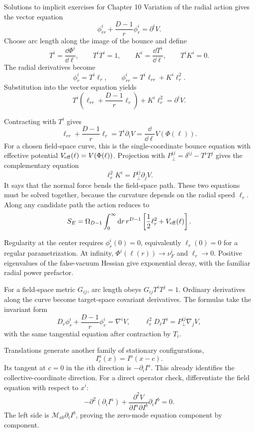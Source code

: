 \begin{bankssolutions}{Solutions to implicit exercises for Chapter 10}
Variation of the radial action gives the vector equation
\[
  \phi_{rr}^i+\frac{D-1}{r}\phi_r^i=\partial^iV.
\]
Choose arc length along the image of the bounce and define
\[
  T^i=\frac{\dd\Phi^i}{\dd\ell},
  \qquad T^iT^i=1,
  \qquad K^i=\frac{\dd T^i}{\dd\ell},
  \qquad T^iK^i=0.
\]
The radial derivatives become
\[
  \phi_r^i=T^i\ell_r,
  \qquad
  \phi_{rr}^i=T^i\ell_{rr}+K^i\ell_r^2.
\]
Substitution into the vector equation yields
\[
  T^i\left(\ell_{rr}+\frac{D-1}{r}\ell_r\right)
  +K^i\ell_r^2=\partial^iV.
\]

Contracting with $T^i$ gives
\[
  \ell_{rr}+\frac{D-1}{r}\ell_r
  =T^i\partial_iV
  =\frac{\dd}{\dd\ell}V(\Phi(\ell)).
\]
For a chosen field-space curve, this is the single-coordinate bounce equation
with effective potential $V_{\rm eff}(\ell)=V(\Phi(\ell))$.  Projection with
$P_\perp^{ij}=\delta^{ij}-T^iT^j$ gives the complementary equation
\[
  \ell_r^2K^i=P_\perp^{ij}\partial_jV.
\]
It says that the normal force bends the field-space path.  These two equations
must be solved together, because the curvature depends on the radial speed
$\ell_r$.  Along any candidate path the action reduces to
\[
  S_E=\Omega_{D-1}\int_0^\infty\mathop{}\!\mathrm{d} r\,r^{D-1}
  \left[\frac12\ell_r^2+V_{\rm eff}(\ell)\right].
\]

Regularity at the center requires $\phi_r^i(0)=0$, equivalently
$\ell_r(0)=0$ for a regular parametrization.  At infinity,
$\Phi^i(\ell(r))\to\nu_F^i$ and $\ell_r\to0$.  Positive eigenvalues of the
false-vacuum Hessian give exponential decay, with the familiar radial power
prefactor.

For a field-space metric $G_{ij}$, arc length obeys
$G_{ij}T^iT^j=1$.  Ordinary derivatives along the curve become target-space
covariant derivatives.  The formulas take the invariant form
\[
  D_r\phi_r^i+\frac{D-1}{r}\phi_r^i=\nabla^iV,
  \qquad
  \ell_r^2D_\ell T^i=P_\perp^{ij}\nabla_jV,
\]
with the same tangential equation after contraction by $T_i$.

Translations generate another family of stationary configurations,
\[
  I_c^a(x)=I^a(x-c).
\]
Its tangent at $c=0$ in the $i$th direction is $-\partial_iI^a$.  This already
identifies the collective-coordinate direction.  For a direct operator check,
differentiate the field equation with respect to $x^i$:
\[
  -\partial^2(\partial_iI^a)
  +\frac{\partial^2V}{\partial I^a\partial I^b}
   \partial_iI^b=0.
\]
The left side is $\mathcal M_{ab}\partial_iI^b$, proving the zero-mode
equation component by component.


\end{bankssolutions}
